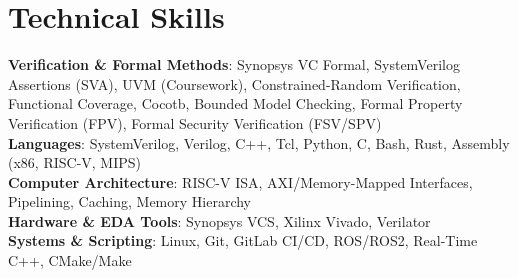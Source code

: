 \section{Technical Skills}
 \begin{itemize}[leftmargin=0.15in, label={}]
    \small{\item{
     \textbf{Verification \& Formal Methods}{: Synopsys VC Formal, SystemVerilog Assertions (SVA), UVM (Coursework), Constrained-Random Verification, Functional Coverage, Cocotb, Bounded Model Checking, Formal Property Verification (FPV), Formal Security Verification (FSV/SPV)} \\
     \textbf{Languages}{: SystemVerilog, Verilog, C++, Tcl, Python, C, Bash, Rust, Assembly (x86, RISC-V, MIPS)} \\
     \textbf{Computer Architecture}{: RISC-V ISA, AXI/Memory-Mapped Interfaces, Pipelining, Caching, Memory Hierarchy} \\
		 \textbf{Hardware \& EDA Tools}{: Synopsys VCS, Xilinx Vivado, Verilator} \\
		 \textbf{Systems \& Scripting}{: Linux, Git, GitLab CI/CD, ROS/ROS2, Real-Time C++, CMake/Make} \\
    }}
 \end{itemize}
